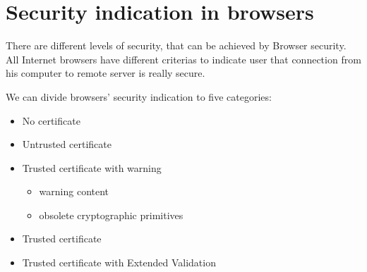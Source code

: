 \chapter{Security indication in browsers}

There are different levels of security, that can be achieved by Browser security. All Internet browsers have different criterias to indicate user that connection from his computer to remote server is really secure.

We can divide browsers' security indication to five categories:

\begin{itemize}
  \item No certificate
  \item Untrusted certificate
  \item Trusted certificate with warning
  \begin{itemize}
    \item warning content
    \item obsolete cryptographic primitives
  \end{itemize}
  \item Trusted certificate
  \item Trusted certificate with Extended Validation
\end{itemize}


